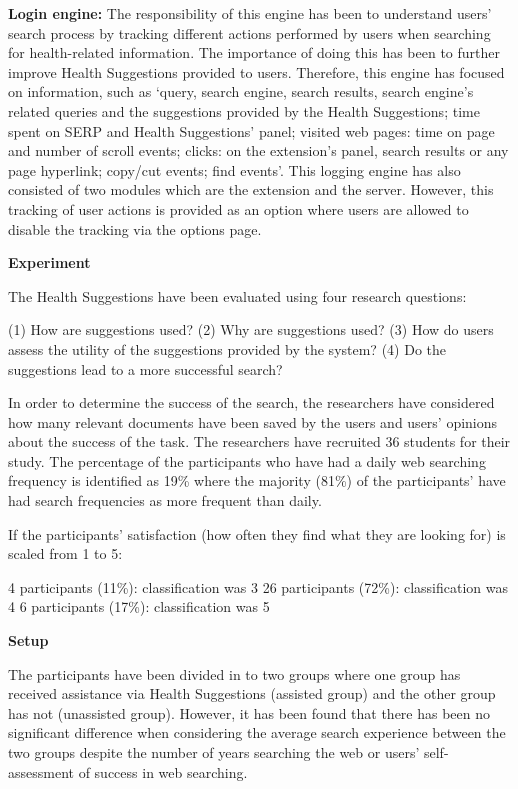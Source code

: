\documentclass[]{article}
\begin{document}
\textbf{Login engine:} The responsibility of this engine has been to understand users’ search process by tracking different actions performed by users when searching for health-related information. The importance of doing this has been to further improve Health Suggestions provided to users. Therefore, this engine has focused on information, such as ‘query, search engine, search results, search engine’s related queries and the suggestions provided by the Health Suggestions; time spent on SERP and Health Suggestions’ panel; visited web pages: time on page and number of scroll events; clicks: on the extension’s panel, search results or any page hyperlink; copy/cut events; find events’. This logging engine has also consisted of two modules which are the extension and the server. However, this tracking of user actions is provided as an option where users are allowed to disable the tracking via the options page.     

\textbf{Experiment}

The Health Suggestions have been evaluated using four research questions:

(1) How are suggestions used? 
(2) Why are suggestions used?
(3) How do users assess the utility of the suggestions provided by the system? 
(4) Do the suggestions lead to a more successful search?

In order to determine the success of the search, the researchers have considered how many relevant documents have been saved by the users and users’ opinions about the success of the task. The researchers have recruited 36 students for their study. The percentage of the participants who have had a daily web searching frequency is identified as 19\% where the majority (81\%) of the participants’ have had search frequencies as more frequent than daily. 
   
If the participants’ satisfaction (how often they find what they are looking for) is scaled from 1 to 5:

4 participants (11\%): classification was 3
26 participants (72\%): classification was 4
6 participants (17\%): classification was 5

\textbf{Setup}

The participants have been divided in to two groups where one group has received assistance via Health Suggestions (assisted group) and the other group has not (unassisted group). However, it has been found that there has been no significant difference when considering the average search experience between the two groups despite the number of years searching the web or users’ self-assessment of success in web searching.
    
\end{document}
